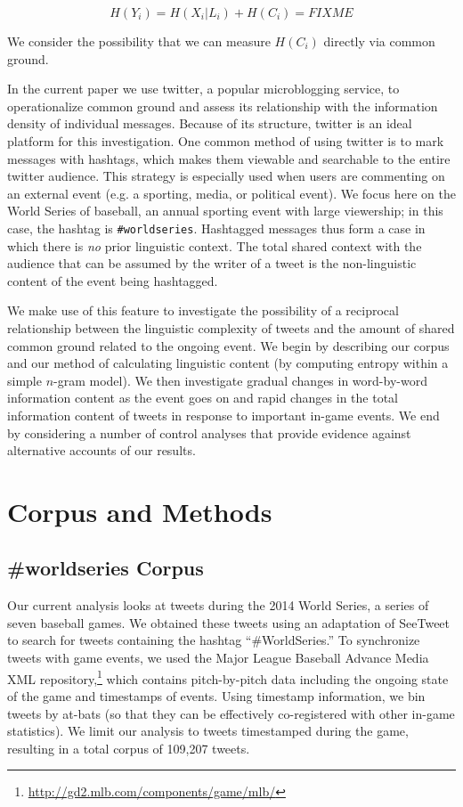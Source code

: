 \documentclass[11pt,letterpaper]{article}
\begin{document}
\begin{equation}
H(Y_i) = H(X_i | L_i) + H(C_i) = FIXME
\end{equation}

\noindent We consider the possibility that we can measure $H(C_i)$ directly via common ground. 

In the current paper we use twitter, a popular microblogging service, to operationalize common ground and assess its relationship with the information density of individual messages. Because of its structure, twitter is an ideal platform for this investigation. One common method of using twitter is to mark messages with hashtags, which makes them viewable and searchable to the entire twitter audience. This strategy is especially used when users are commenting on an external event (e.g. a sporting, media, or political event). We focus here on the World Series of baseball, an annual sporting event with large viewership; in this case, the hashtag is \texttt{\#worldseries}. Hashtagged messages thus form a case in which there is \emph{no} prior linguistic context. The total shared context with the audience that can be assumed by the writer of a tweet is the non-linguistic content of the event being hashtagged. 

We make use of this feature to investigate the possibility of a reciprocal relationship between the linguistic complexity of tweets and the amount of shared common ground related to the ongoing event. We begin by describing our corpus and our method of calculating linguistic content (by computing entropy within a simple $n$-gram model). We then investigate gradual changes in word-by-word information content as the event goes on and rapid changes in the total information content of tweets in response to important in-game events. We end by considering a number of control analyses that provide evidence against alternative accounts of our results. 

\section{Corpus and Methods}

\subsection{\#worldseries Corpus}

Our current analysis looks at tweets during the 2014 World Series, a series of seven baseball games.  We obtained these tweets using an adaptation of SeeTweet \cite{doyle2014} to search for tweets containing the hashtag ``\#WorldSeries.''  To synchronize tweets with game events, we used the Major League Baseball Advance Media XML repository,\footnote{\url{http://gd2.mlb.com/components/game/mlb/}} which contains pitch-by-pitch data including the ongoing state of the game and timestamps of events. Using timestamp information, we bin tweets by at-bats (so that they can be effectively co-registered with other in-game statistics).  We limit our analysis to tweets timestamped during the game, resulting in a total corpus of 109,207 tweets.
\end{document}
